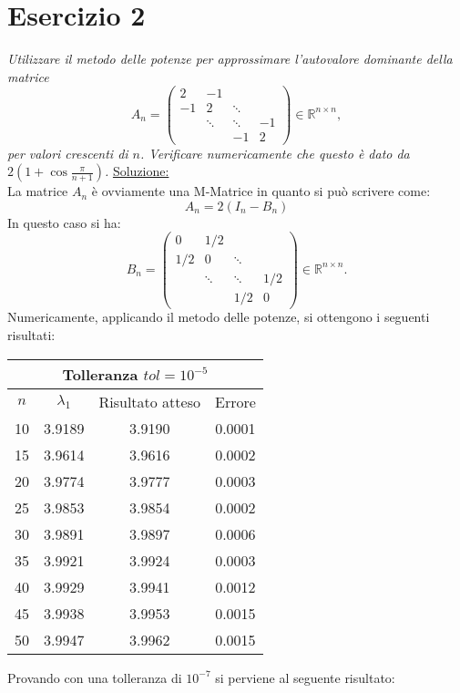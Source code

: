 \section{Esercizio 2}
\label{sub:Es2}
\emph{
      Utilizzare il metodo delle potenze per approssimare l'autovalore dominante della matrice
			\[
				A_n=\begin{pmatrix}
					2 & -1 & &\\
					-1 & 2 & \ddots &\\
					& \ddots & \ddots & -1\\
					& & -1 & 2
				\end{pmatrix}\in\mathbb{R}^{n\times n},
			\]
			per valori crescenti di $n$. Verificare numericamente che questo è dato da $2\left(1+\cos\frac{\pi}{n+1}\right)$.
}
\underline{Soluzione:}\\
La matrice $A_{n}$ è ovviamente una M-Matrice in quanto si può scrivere come:
$$A_{n} = 2 (I_{n} - B_{n})$$
In questo caso si ha:
$$B_n=\begin{pmatrix}0&1/2&&\\1/2&0&\ddots&\\&\ddots&\ddots&1/2\\&&1/2&0\end{pmatrix}\in\mathbb{R}^{n\times n}.$$
Numericamente, applicando il metodo delle potenze, si ottengono i seguenti risultati:
\begin{center}\begin{tabular}{c|c|c|c}
\hline\multicolumn{4}{c}{Tolleranza $tol=10^{-5}$}\\\hline
$n$ & $\lambda_1$ & Risultato atteso & Errore \\\hline
10 & 3.9189 & 3.9190 & 0.0001 \\
15 & 3.9614 & 3.9616 & 0.0002 \\
20 & 3.9774 & 3.9777 & 0.0003 \\
25 & 3.9853 & 3.9854 & 0.0002 \\
30 & 3.9891 & 3.9897 & 0.0006 \\
35 & 3.9921 & 3.9924 & 0.0003 \\
40 & 3.9929 & 3.9941 & 0.0012 \\
45 & 3.9938 & 3.9953 & 0.0015 \\
50 & 3.9947 & 3.9962 & 0.0015
\end{tabular}\end{center}

Provando con una tolleranza di $10^{-7}$ si perviene al seguente risultato:\\

